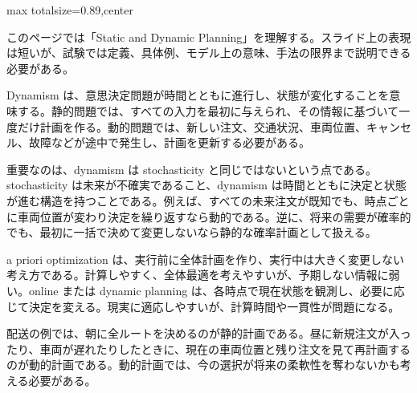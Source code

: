 \begin{minipage}[t]{0.58\textwidth}
\begin{adjustbox}{max totalsize={\textwidth}{0.89\textheight},center}
\begin{minipage}{\textwidth}\scriptsize
{}このページでは「Static and Dynamic Planning」を理解する。スライド上の表現は短いが、試験では定義、具体例、モデル上の意味、手法の限界まで説明できる必要がある。\par
Dynamism は、意思決定問題が時間とともに進行し、状態が変化することを意味する。静的問題では、すべての入力を最初に与えられ、その情報に基づいて一度だけ計画を作る。動的問題では、新しい注文、交通状況、車両位置、キャンセル、故障などが途中で発生し、計画を更新する必要がある。\par
重要なのは、dynamism は stochasticity と同じではないという点である。stochasticity は未来が不確実であること、dynamism は時間とともに決定と状態が進む構造を持つことである。例えば、すべての未来注文が既知でも、時点ごとに車両位置が変わり決定を繰り返すなら動的である。逆に、将来の需要が確率的でも、最初に一括で決めて変更しないなら静的な確率計画として扱える。\par
a priori optimization は、実行前に全体計画を作り、実行中は大きく変更しない考え方である。計算しやすく、全体最適を考えやすいが、予期しない情報に弱い。online または dynamic planning は、各時点で現在状態を観測し、必要に応じて決定を変える。現実に適応しやすいが、計算時間や一貫性が問題になる。\par
配送の例では、朝に全ルートを決めるのが静的計画である。昼に新規注文が入ったり、車両が遅れたりしたときに、現在の車両位置と残り注文を見て再計画するのが動的計画である。動的計画では、今の選択が将来の柔軟性を奪わないかも考える必要がある。\par

\end{minipage}
\end{adjustbox}
\end{minipage}
